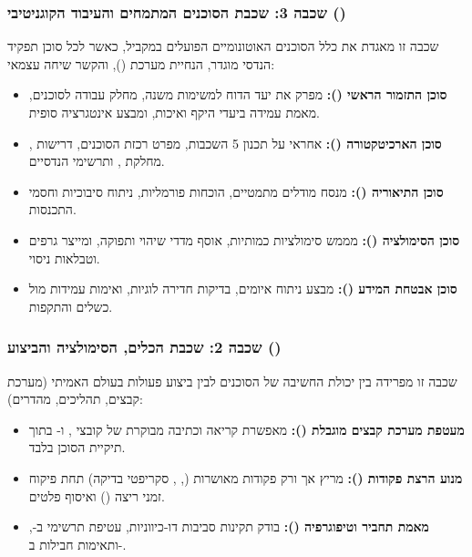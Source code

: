 \subsubsection{שכבה 3: שכבת הסוכנים המתמחים והעיבוד הקוגניטיבי ()}
שכבה זו מאגדת את כלל הסוכנים האוטונומיים הפועלים במקביל, כאשר לכל סוכן תפקיד הנדסי מוגדר, הנחיית מערכת (), והקשר שיחה עצמאי:
\begin{itemize}[leftmargin=1.2cm]
  \item \textbf{סוכן התזמור הראשי ():} מפרק את יעד הדוח למשימות משנה, מחלק עבודה לסוכנים, מאמת עמידה ביעדי היקף ואיכות, ומבצע אינטגרציה סופית.
  \item \textbf{סוכן הארכיטקטורה ():} אחראי על תכנון 5 השכבות, מפרט רכזת הסוכנים, דרישות , מחלקת , ותרשימי  הנדסיים.
  \item \textbf{סוכן התיאוריה ():} מנסח מודלים מתמטיים, הוכחות פורמליות, ניתוח סיבוכיות וחסמי התכנסות.
  \item \textbf{סוכן הסימולציה ():} מממש סימולציות כמותיות, אוסף מדדי שיהוי ותפוקה, ומייצר גרפים וטבלאות ניסוי.
  \item \textbf{סוכן אבטחת המידע ():} מבצע ניתוח איומים, בדיקות חדירה לוגיות, ואימות עמידות מול כשלים והתקפות.
\end{itemize}

\subsubsection{שכבה 2: שכבת הכלים, הסימולציה והביצוע ()}
שכבה זו מפרידה בין יכולת החשיבה של הסוכנים לבין ביצוע פעולות בעולם האמיתי (מערכת קבצים, תהליכים, מהדרים):
\begin{itemize}[leftmargin=1.2cm]
  \item \textbf{מעטפת מערכת קבצים מוגבלת ():} מאפשרת קריאה וכתיבה מבוקרת של קובצי ,  ו- בתוך תיקיית הסוכן בלבד.
  \item \textbf{מנוע הרצת פקודות ():} מריץ אך ורק פקודות מאושרות (, , סקריפטי בדיקה) תחת פיקוח זמני ריצה () ואיסוף פלטים.
  \item \textbf{מאמת תחביר וטיפוגרפיה ():} בודק תקינות סביבות דו-כיווניות, עטיפת תרשימי  ב-, ותאימות חבילות ב-.
\end{itemize}

